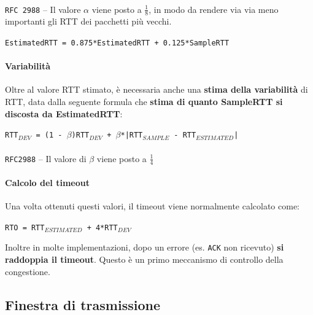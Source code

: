 \documentclass[10pt]{article}
\begin{document}
\paragraph{} \texttt{RFC 2988} -- Il valore $\alpha$ viene posto a $\frac{1}{8}$, in modo da rendere via via meno importanti gli RTT dei pacchetti più vecchi.
\begin{center}
\texttt{EstimatedRTT = 0.875*EstimatedRTT + 0.125*SampleRTT}
\end{center}
\paragraph{Variabilità} Oltre al valore RTT stimato, è necessaria anche una \textbf{stima della variabilità} di RTT, data dalla seguente formula che \textbf{stima di quanto SampleRTT si discosta da EstimatedRTT}:
\begin{center}
\texttt{RTT$_{DEV}$ = (1 - $\beta$)RTT$_{DEV}$ + $\beta$*|RTT$_{SAMPLE}$ - RTT$_{ESTIMATED}$|}
\end{center}
\paragraph{} \texttt{RFC2988} -- Il valore di $\beta$ viene posto a $\frac{1}{4}$
\paragraph{Calcolo del timeout} Una volta ottenuti questi valori, il timeout viene normalmente calcolato come:
\begin{center}
\texttt{RTO = RTT$_{ESTIMATED}$ + 4*RTT$_{DEV}$}
\end{center}
Inoltre in molte implementazioni, dopo un errore (es. \texttt{ACK} non ricevuto) \textbf{si raddoppia il timeout}. Questo è un primo meccanismo di controllo della congestione.
\subsection{Finestra di trasmissione}
\end{document}
